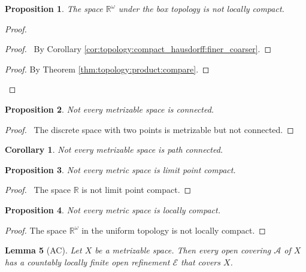 \documentclass{report}
\let\qed\relax
\newtheorem{lm}{Lemma}[section]
\newtheorem{prop}[lm]{Proposition}
\newtheorem{cor}{Corollary}[lm]
\theoremstyle{definition}
\begin{document}
 \begin{prop}
 	The space $\mathbb{R}^\omega$ under the box topology is not locally compact.
 \end{prop}

 \begin{proof}
 	\pf
 	\begin{proof}
 		\pf\ By Corollary \ref{cor:topology:compact_hausdorff:finer_coarser}.
 	\end{proof}
 	\begin{proof}
 		\pf By Theorem \ref{thm:topology:product:compare}.
 	\end{proof}
 	\qed
 \end{proof}

 \begin{prop}
 Not every metrizable space is connected.
\end{prop}

\begin{proof}
 \pf\ The discrete space with two points is metrizable but not connected. \qed
\end{proof}

\begin{cor}
 Not every metrizable space is path connected.
\end{cor}

\begin{prop}
  Not every metric space is limit point compact.
\end{prop}

\begin{proof}
  \pf\ The space $\mathbb{R}$ is not limit point compact. \qed
\end{proof}

\begin{prop}
  Not every metric space is locally compact.
\end{prop}

\begin{proof}
  The space $\mathbb{R}^\omega$ in the uniform topology is not locally compact.
\end{proof}

\begin{lm}[AC]
  Let $X$ be a metrizable space. Then every open covering $\mathcal{A}$ of $X$ has a countably locally finite open refinement $\mathcal{E}$ that covers $X$.
\end{lm}
\end{document}
